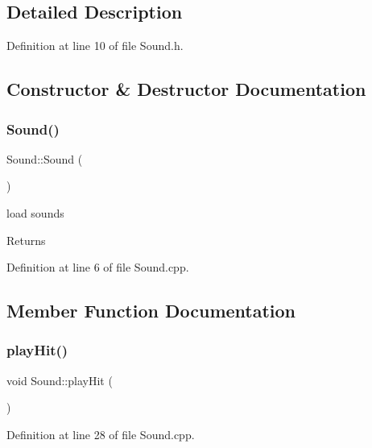 \subsection{Detailed Description}


Definition at line 10 of file Sound.\+h.



\subsection{Constructor \& Destructor Documentation}
\hypertarget{class_sound_a539c205cdf06fe2c621fd77c37bcfac9}{}\label{class_sound_a539c205cdf06fe2c621fd77c37bcfac9} 
\subsubsection{\texorpdfstring{Sound()}{Sound()}}
{\footnotesize\ttfamily Sound\+::\+Sound (\begin{DoxyParamCaption}{ }\end{DoxyParamCaption})}

load sounds \begin{DoxyReturn}{Returns}

\end{DoxyReturn}


Definition at line 6 of file Sound.\+cpp.



\subsection{Member Function Documentation}
\hypertarget{class_sound_a8745b80c3bdd62893f74383cb939ca6e}{}\label{class_sound_a8745b80c3bdd62893f74383cb939ca6e} 
\subsubsection{\texorpdfstring{play\+Hit()}{playHit()}}
{\footnotesize\ttfamily void Sound\+::play\+Hit (\begin{DoxyParamCaption}{ }\end{DoxyParamCaption})}



Definition at line 28 of file Sound.\+cpp.

\hypertarget{class_sound_a56de021d1ec151a13e4e9f8b583eef24}{}\label{class_sound_a56de021d1ec151a13e4e9f8b583eef24} 
